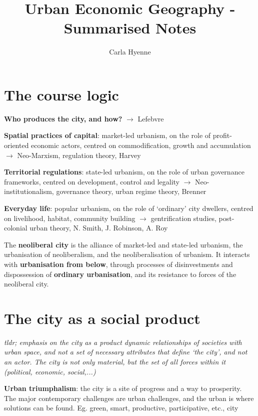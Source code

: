 \documentclass{article}
\title{Urban Economic Geography - Summarised Notes}
\author{Carla Hyenne }
\newcommand{\alignedmarginpar}[1]{%
        \marginpar{\raggedright\small #1}
    }
\begin{document}
\maketitle

\tableofcontents

\pagebreak
\section{The course logic}

\textbf{Who produces the city, and how?} $\rightarrow$ Lefebvre

\textbf{Spatial practices of capital}: market-led urbanism, on the role of profit-oriented economic actors, centred on commodification, growth and accumulation $\rightarrow$ Neo-Marxism, regulation theory, Harvey

\textbf{Territorial regulations}: state-led urbanism, on the role of urban governance frameworks, centred on development, control and legality $\rightarrow$ Neo-institutionalism, governance theory, urban regime theory, Brenner

\textbf{Everyday life}: popular urbanism, on the role of `ordinary' city dwellers, centred on livelihood, habitat, community building $\rightarrow$ gentrification studies, post-colonial urban theory, N. Smith, J. Robinson, A. Roy

The \textbf{neoliberal city} is the alliance of market-led and state-led urbanism, the urbanisation of neoliberalism, and the neoliberalisation of urbanism. It interacts with \textbf{urbanisation from below}, through processes of disinvestments and dispossession of \textbf{ordinary urbanisation}, and its resistance to forces of the neoliberal city.

\pagebreak
\section{The city as a social product}

\textit{tldr; emphasis on the city as a product dynamic relationships of societies with urban space, and not a set of necessary attributes that define `the city', and not an actor. The city is not only material, but the set of all forces within it (political, economic, social,...)}

\textbf{Urban triumphalism}: the city is a site of progress and a way to prosperity. The major contemporary challenges are urban challenges, and the urban is where solutions can be found. Eg. green, smart, productive, participative, etc., city \alignedmarginpar{Glaeser}
\end{document}
